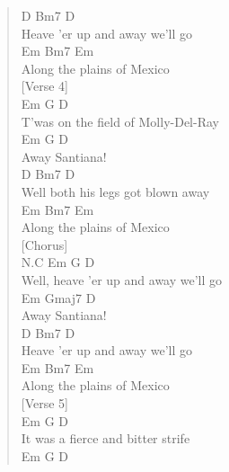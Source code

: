 \documentclass[11pt]{article}
\begin{document}
\begin{verse}
D                  Bm7        D\\
\hspace*{1em}Heave 'er up and away we'll go\\
\hspace*{1em}Em       Bm7       Em\\
Along the plains of Mexico\\
\vspace*{1em}
\vspace*{1em}
[Verse 4]\\
\hspace*{6em}Em              G         D\\
T'was on the field of Molly-Del-Ray\\
\hspace*{1em}Em       G D\\
Away Santiana!\\
\hspace*{5em}D                 Bm7   D\\
Well both his legs got blown away\\
\hspace*{1em}Em       Bm7       Em\\
Along the plains of Mexico\\
\vspace*{1em}
\vspace*{1em}
[Chorus]\\
N.C Em                  G         D\\
Well, heave 'er up and away we'll go\\
\hspace*{1em}Em     Gmaj7 D\\
Away Santiana!\\
D                  Bm7        D\\
\hspace*{1em}Heave 'er up and away we'll go\\
\hspace*{1em}Em       Bm7       Em\\
Along the plains of Mexico\\
\vspace*{1em}
\vspace*{1em}
[Verse 5]\\
\hspace*{3em}Em               G      D\\
It was a fierce and bitter strife\\
\hspace*{1em}Em       G D\\

\end{verse}
\end{document}
